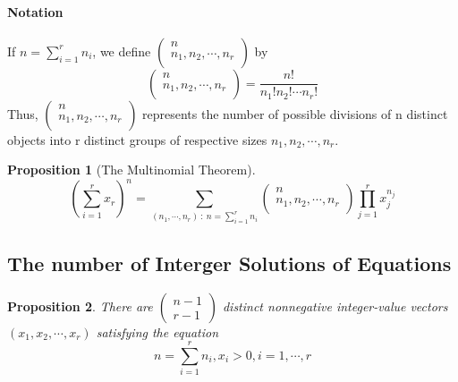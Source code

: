 \documentclass[12pt]{article}
\newtheorem{proposition}{Proposition}[subsection]
\begin{document}
    \paragraph{Notation}
    If $n = \sum_{i=1}^rn_i$, we define $\left(\begin{array}{c}n\\{n_1, n_2,\cdots,n_r}\\ \end{array}\right)$ by
    \begin{equation}
        \left(\begin{array}{c}n\\{n_1, n_2,\cdots,n_r}\\ \end{array}\right) = \frac{n!}{n_1!n_2!\cdots n_r!}
    \end{equation}
     Thus, $\left(\begin{array}{c}n\\{n_1, n_2,\cdots,n_r}\\ \end{array}\right)$ represents the number of possible divisions of n distinct objects into r distinct groups of respective sizes $n_1,n_2, \cdots, n_r$.
     \begin{proposition}[The Multinomial Theorem]
         \begin{equation}
             (\sum_{i=1}^r x_r)^n = \sum_{(n_1,\cdots, n_r)\ :\ n = \sum_{i=1}^rn_i} \left(\begin{array}{c}n\\{n_1, n_2,\cdots,n_r}\\ \end{array}\right)\prod_{j=1}^r x_j^{n_j}
         \end{equation}
     \end{proposition}

    \subsection{The number of Interger Solutions of Equations}
    
    \begin{proposition}
        There are $\left( \begin{array}{c} n-1\\ r-1 \end{array} \right)$ distinct nonnegative integer-value vectors $(x_1, x_2, \cdots, x_r)$ satisfying the equation
        \begin{equation}
            n = \sum_{i=1}^rn_i, x_i > 0, i = 1,\cdots, r
        \end{equation}
    \end{proposition}
\end{document}
